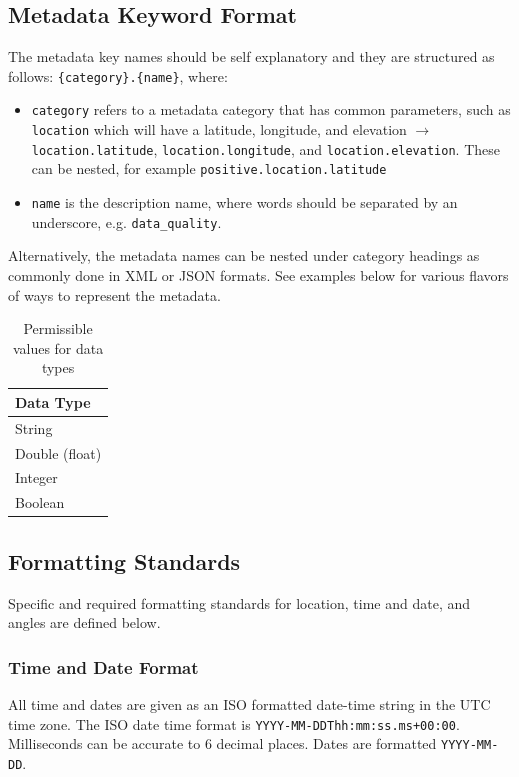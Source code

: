 \documentclass{article}
\begin{document}
\subsection{Metadata Keyword Format}

The metadata key names should be self explanatory and they are structured as follows: \verb|{category}.{name}|, where:
\begin{itemize}
	\item \verb|category| refers to a metadata category that has common parameters, such as \verb|location| which will have a latitude, longitude, and elevation $\longrightarrow$ \verb|location.latitude|, \verb|location.longitude|, and \verb|location.elevation|.  These can be nested, for example \verb|positive.location.latitude|
	\item \verb|name| is the description name, where words should be separated by an underscore, e.g. \verb|data_quality|.  
\end{itemize}  

Alternatively, the metadata names can be nested under category headings as commonly done in XML or JSON formats.  See examples below for various flavors of ways to represent the metadata.      

\begin{table}[htb!]
	\caption[Data types]{Permissible values for data types}
	\centering
	\begin{tabular}{l}
		\hline
		\textbf{Data Type} \\
		\hline
		String  \\ 
		Double (float) \\
		Integer  \\ 
		Boolean  \\ \hline
	\end{tabular}
	\label{tab:types}
\end{table}

\subsection{Formatting Standards}

Specific and required formatting standards for location, time and date, and angles are defined below.

\subsubsection{Time and Date Format}

All time and dates are given as an ISO formatted date-time string in the UTC time zone.  The ISO date time format is \verb|YYYY-MM-DDThh:mm:ss.ms+00:00|.  Milliseconds can be accurate to 6 decimal places.  Dates are formatted \verb|YYYY-MM-DD|. 
\end{document}

